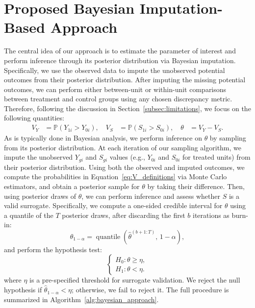\documentclass[12pt]{article}
\newcommand{\Prob}{\mathbb{P}}
\begin{document}
\section{Proposed Bayesian Imputation-Based Approach}\label{sec:bayesian_approach}
The central idea of our approach is to estimate the parameter of interest and perform inference through its posterior distribution via Bayesian imputation. Specifically, we use the observed data to impute the unobserved potential outcomes from their posterior distribution. After imputing the missing potential outcomes, we can perform either between-unit or within-unit comparisons between treatment and control groups using any chosen discrepancy metric. Therefore, following the discussion in Section~\ref{subsec:limitations}, we focus on the following quantities:
\begin{equation}
  \label{eq:V_definitions}
  \begin{aligned}
    V_{Y} & = \Prob(Y_{1i} > Y_{0i}), \quad V_{S} & = \Prob(S_{1i} > S_{0i}), \quad \theta & = V_{Y} - V_{S}.
  \end{aligned}
\end{equation}
As is typically done in Bayesian analysis, we perform inference on \(\theta\) by sampling from its posterior distribution. At each iteration of our sampling algorithm, we impute the unobserved \(Y_{gi}\) and \(S_{gi}\) values (e.g., \(Y_{0i}\) and \(S_{0i}\) for treated units) from their posterior distribution. Using both the observed and imputed outcomes, we compute the probabilities in Equation~\eqref{eq:V_definitions} via Monte Carlo estimators, and obtain a posterior sample for \(\theta\) by taking their difference. Then, using posterior draws of \(\theta\), we can perform inference and assess whether \(S\) is a valid surrogate. Specifically, we compute a one-sided credible interval for \(\theta\) using a quantile of the \(T\) posterior draws, after discarding the first \(b\) iterations as burn-in:
\begin{equation}
    \widehat{\theta}_{1 - \alpha} 
    = \operatorname{quantile}\!\left( \widehat{\theta}^{(b+1:T)},\, 1 - \alpha \right),
\end{equation}
and perform the hypothesis test:
\begin{equation}
    \label{eq:hypothesis_test_theta}
    \begin{cases}
        H_{0}: \theta \geq \eta, \\
        H_{1}: \theta < \eta.
    \end{cases}
\end{equation}
where \(\eta\) is a pre-specified threshold for surrogate validation. We reject the null hypothesis if \(\widehat{\theta}_{1 - \alpha} < \eta\); otherwise, we fail to reject it. The full procedure is summarized in Algorithm~\ref{alg:bayesian_approach}.
\end{document}
